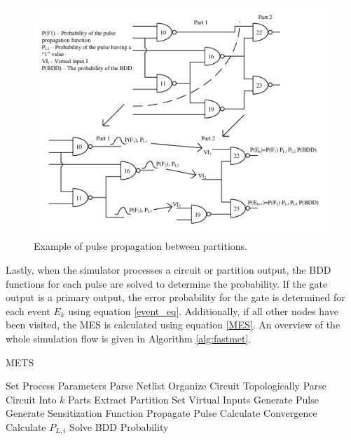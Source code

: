 \documentclass[conference]{IEEEtran}
\begin{document}
\begin{figure}[!htbp]
	\centering
	\includegraphics[width=\linewidth]{Figures/PartProp}
	\caption{Example of pulse propagation between partitions.}
	\label{PART_PROP}
\end{figure}

\setlength{\abovecaptionskip}{5pt}

\setlength{\belowcaptionskip}{5pt}

Lastly, when the simulator processes a circuit or partition output, the BDD functions for each pulse are solved to determine the probability. If the gate output is a primary output, the error probability for the gate is determined for each event $E_k$ using equation \ref{event_eq}. Additionally, if all other nodes have been visited, the MES is calculated using equation \ref{MES}. An overview of the whole simulation flow is given in Algorithm \ref{alg:fastmet}.

\begin{algorithm}
	\caption{METS} \label{alg:fastmet}
	\begin{algorithmic} [1]
		\STATE Set Process Parameters
		\STATE Parse Netlist
		\STATE Organize Circuit Topologically
		\STATE Parse Circuit Into $k$ Parts
		\STATE Extract Partition
		\STATE Set Virtual Inputs
		\STATE Generate Pulse
		\STATE Generate Sensitization Function
		\STATE Propagate Pulse
		\STATE Calculate Convergence
		\STATE Calculate $P_{L,i}$
		\STATE Solve BDD Probability
		\ENDIF
		\ENDFOR
		\ENDFOR		
	\end{algorithmic}
\end{algorithm}
\end{document}
